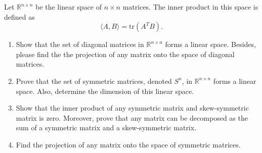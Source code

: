 \documentclass[11pt,letter,notitlepage]{article}
\begin{document}
\newpage
    \begin{exercise}
        Let $\mathbb{R}^{n \times n}$ be the linear space of \(n \times n\) matrices. The inner product in this space is defined as \[ \langle A, B \rangle = \text{tr}(A^T B). \]
                \begin{enumerate}
                    \item Show that the set of diagonal matrices in $\mathbb{R}^{n \times n}$ forms a linear space. Besides, please find the the projection of any matrix onto the space of diagonal matrices.
                
                    \item Prove that the set of symmetric matrices, denoted $S^n$, in $\mathbb{R}^{n \times n}$ forms a linear space. Also, determine the dimension of this linear space.
    
                    \item Show that the inner product of any symmetric matrix and skew-symmetric matrix is zero. Moreover, prove that any matrix can be decomposed as the sum of a symmetric matrix and a skew-symmetric matrix.
    
                    \item Find the projection of any matrix onto the space of symmetric matrices.
                \end{enumerate}
    \end{exercise}
\end{document}
